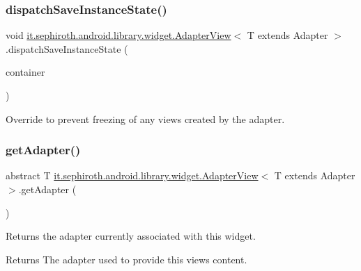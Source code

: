 \subsubsection{\texorpdfstring{dispatch\+Save\+Instance\+State()}{dispatchSaveInstanceState()}}
{\footnotesize\ttfamily void \hyperlink{classit_1_1sephiroth_1_1android_1_1library_1_1widget_1_1_adapter_view}{it.\+sephiroth.\+android.\+library.\+widget.\+Adapter\+View}$<$ T extends Adapter $>$.dispatch\+Save\+Instance\+State (\begin{DoxyParamCaption}\item[{Sparse\+Array$<$ Parcelable $>$}]{container }\end{DoxyParamCaption})\hspace{0.3cm}{\ttfamily [protected]}}

Override to prevent freezing of any views created by the adapter. \mbox{\label{classit_1_1sephiroth_1_1android_1_1library_1_1widget_1_1_adapter_view_afb79f607af696fd557a668a935185eb4}} 
\subsubsection{\texorpdfstring{get\+Adapter()}{getAdapter()}}
{\footnotesize\ttfamily abstract T \hyperlink{classit_1_1sephiroth_1_1android_1_1library_1_1widget_1_1_adapter_view}{it.\+sephiroth.\+android.\+library.\+widget.\+Adapter\+View}$<$ T extends Adapter $>$.get\+Adapter (\begin{DoxyParamCaption}{ }\end{DoxyParamCaption})\hspace{0.3cm}{\ttfamily [abstract]}}

Returns the adapter currently associated with this widget.

\begin{DoxyReturn}{Returns}
The adapter used to provide this view\textquotesingle{}s content. 
\end{DoxyReturn}
\mbox{\label{classit_1_1sephiroth_1_1android_1_1library_1_1widget_1_1_adapter_view_aaaaaeeaf019688a14e82499a294bc9c2}} 

